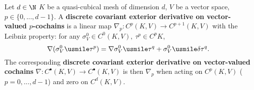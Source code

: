 \begin{definition}
  Let
    $d \in \N$
    $K$ be a quasi-cubical mesh of dimension $d$,
    $V$ be a vector space,
    $p \in \{0, ..., d - 1\}$.
  A \textbf{discrete covariant exterior derivative on vector-valued
  $p$-cochains} is a linear map
  $\nabla_p \colon C^p(K, V) \to C^{p + 1}(K, V)$ with the Leibniz property:
  for any $\sigma_V^0 \in C^0(K, V),\ \tau^p \in C^p K$,
  \begin{equation}
    \nabla(\sigma_V^0 \usmile \tau^p)
    = \nabla \sigma_V^0 \usmile \tau^q + \sigma_V^0 \usmile \delta \tau^q.
  \end{equation}
  The corresponding
  \textbf{discrete covariant exterior derivative on vector-valued cochains}
  $\nabla \colon C^\bullet(K, V) \to C^\bullet(K, V)$
  is then $\nabla_p$ when acting on $C^p(K, V)$ ($p = 0, ..., d - 1$)
  and zero on $C^d(K, V)$.
\end{definition}
